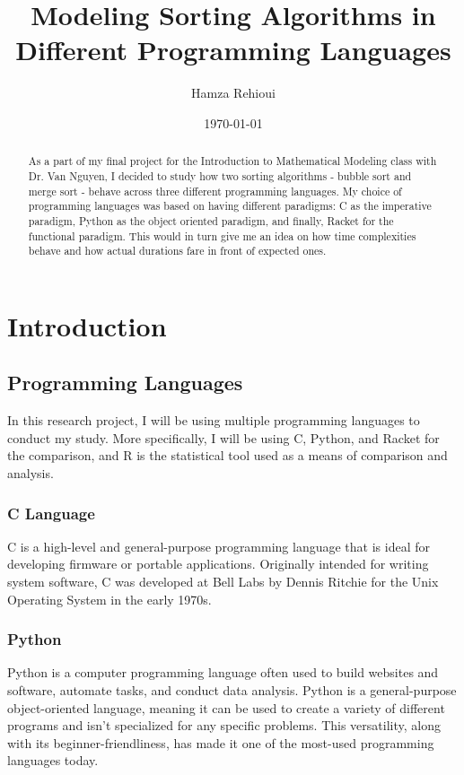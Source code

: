 \documentclass[]{report}
\title{Modeling Sorting Algorithms in Different Programming Languages}
\author{Hamza Rehioui}
\date{\today}
\begin{document}
 
    \maketitle
	\begin{abstract}
		As a part of my final project for the Introduction to Mathematical Modeling class with Dr. Van Nguyen, I decided to study how two sorting algorithms - bubble sort and merge sort - behave across three different programming languages. My choice of programming languages was based on having different paradigms: C as the imperative paradigm, Python as the object oriented paradigm, and finally, Racket for the functional paradigm. This would in turn give me an idea on how time complexities behave and how actual durations fare in front of expected ones.
	\end{abstract}
	
	\tableofcontents
	\listoffigures
	\listoftables
	
	\pagebreak
    
    \chapter{Introduction}
    
    	\section{Programming Languages}
	    In this research project, I will be using multiple programming languages to conduct my study. More specifically, I will be using C, Python, and Racket for the comparison, and R is the statistical tool used as a means of comparison and analysis.
	    	\subsection{C Language}
	    	C is a high-level and general-purpose programming language that is ideal for developing firmware or portable applications. Originally intended for writing system software, C was developed at Bell Labs by Dennis Ritchie for the Unix Operating System in the early 1970s. \cite{techopedia_2018}
	    	\subsection{Python}
	    	Python is a computer programming language often used to build websites and software, automate tasks, and conduct data analysis. Python is a general-purpose object-oriented language, meaning it can be used to create a variety of different programs and isn’t specialized for any specific problems. This versatility, along with its beginner-friendliness, has made it one of the most-used programming languages today. \cite{coursera}
\end{document}
